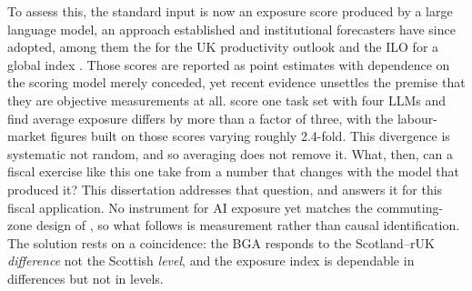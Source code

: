 To assess this, the standard input is now an exposure score produced by a large language model, an approach \citet{eloundou2024} established and institutional forecasters have since adopted, among them the \citet{obr2025} for the UK productivity outlook and the ILO for a global index \citep{gmyrek2023}. Those scores are reported as point estimates with dependence on the scoring model merely conceded, yet recent evidence unsettles the premise that they are objective measurements at all. \citet{yin2026} score one task set with four LLMs and find average exposure differs by more than a factor of three, with the labour-market figures built on those scores varying roughly 2.4-fold. This divergence is systematic not random, and so averaging does not remove it. What, then, can a fiscal exercise like this one take from a number that changes with the model that produced it? This dissertation addresses that question, and answers it for this fiscal application. No instrument for AI exposure yet matches the commuting-zone design of \citet{acemoglu2020}, so what follows is measurement rather than causal identification. The solution rests on a coincidence: the BGA responds to the Scotland--rUK \textit{difference} not the Scottish \textit{level}, and the exposure index is dependable in differences but not in levels.



